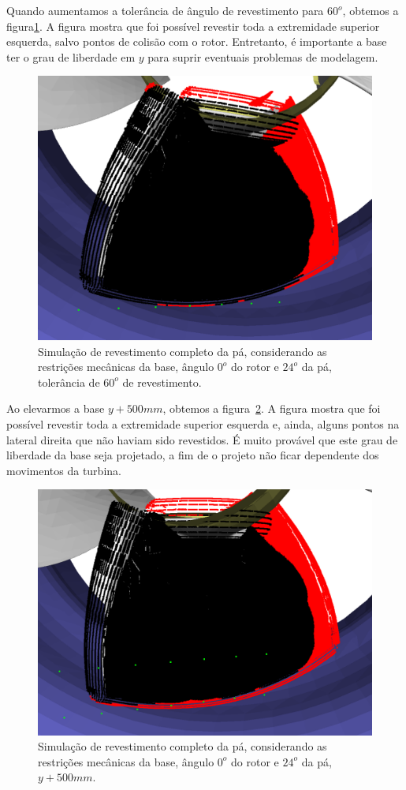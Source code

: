 Quando aumentamos a tolerância de ângulo de revestimento
para $60^o$, obtemos a figura\ref{fig::simcomp1_3}. A figura mostra que foi
possível revestir toda a extremidade superior esquerda, salvo pontos de colisão
com o rotor. Entretanto, é importante a base ter o grau de liberdade em $y$ para
suprir eventuais problemas de modelagem.

\begin{figure}[!ht]
	\centering	
	\includegraphics[width=.5\columnwidth]{method/figs/simcomp1_3.png}
	\caption{Simulação de revestimento completo da pá, considerando as
	restrições mecânicas da base, ângulo $0^o$ do rotor e $24^o$ da pá,
	tolerância de $60^o$ de revestimento.}
	\label{fig::simcomp1_3}
\end{figure}

Ao elevarmos a base $y+500 mm$, obtemos a figura~\ref{fig::simcomp1_6}. A figura
mostra que foi possível revestir toda a extremidade superior esquerda e, ainda,
alguns pontos na lateral direita que não haviam sido revestidos. É muito
provável que este grau de liberdade da base seja projetado, a fim de o projeto
não ficar dependente dos movimentos da turbina.

\begin{figure}[!ht]
	\centering	
	\includegraphics[width=.5\columnwidth]{method/figs/simcomp1_6.png}
	\caption{Simulação de revestimento completo da pá, considerando as
	restrições mecânicas da base, ângulo $0^o$ do rotor e $24^o$ da pá,
	$y+500 mm$.}
	\label{fig::simcomp1_6}
\end{figure}

